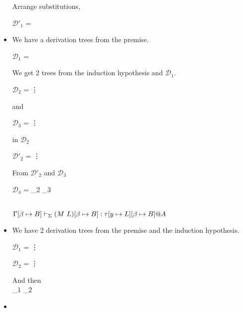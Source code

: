 \begin{itemize}
	      Arrange substitutions,

	      $\mathcal{D}'_1$ = 
	      { \andalso {}}

	\item \TApp

	      We have a derivation trees from the premise.

	      $\mathcal{D}_1$ = 
	      {}

	      We get 2 trees from the induction hypothesis and $\mathcal{D}_1$.

	      $\mathcal{D}_2$ = 
	      {\vdots}

	      and

	      $\mathcal{D}_3$ = 
	      {\vdots}

	       in $\mathcal{D}_2$

	      $\mathcal{D'}_2$ = 
	      {\vdots}

	      From $\mathcal{D'}_2$ and $\mathcal{D}_3$

	      $\mathcal{D}_4$ = 
	      {_2 \andalso {}_3}

	       \\
	      $\GGV (M\ L)\SB: \tau[y \mapsto L]\SB@A$

	\item \TConv

	      We have 2 derivation trees from the premise and the induction hypothesis.

	      $\mathcal{D}_1$ = 
	      {\vdots}

	      $\mathcal{D}_2$ = 
	      {\vdots}

	      And then \\
	      {_1 \andalso {}_2}

	\item \TTB


\end{itemize}
